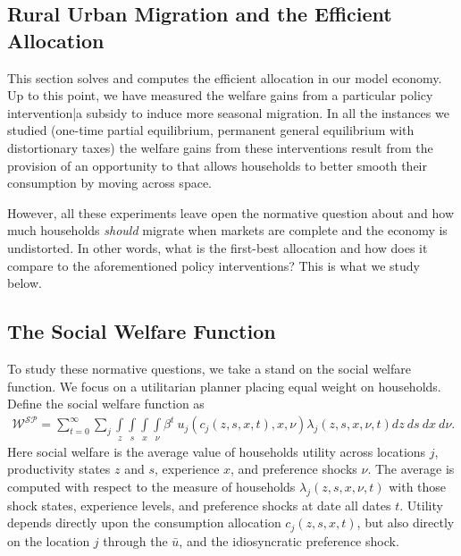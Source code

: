 \documentclass[12pt,pdftex]{article}
\begin{document}
\begin{onehalfspacing}
\newpage

\normalsize



\section{Rural Urban Migration and the Efficient Allocation}\label{sed:intro}

This section solves and computes the efficient allocation in our model economy. Up to this point, we have measured the welfare gains from a particular policy intervention|a subsidy to induce more seasonal migration. In all the instances we studied (one-time partial equilibrium, permanent general equilibrium with distortionary taxes) the welfare gains from these interventions result from the provision of an opportunity to that allows households to better smooth their consumption by moving across space.

However, all these experiments leave open the normative question about and how much households \emph{should} migrate when markets are complete and the economy is undistorted. In other words, what is the first-best allocation and how does it compare to the aforementioned policy interventions? This is what we study below.

\subsection{The Social Welfare Function}

To study these normative questions, we take a stand on the social welfare function. We focus on a utilitarian planner placing equal weight on households. Define the social welfare function as
\begin{align}
\mathcal{W^{SP}} = \sum_{t=0}^{\infty}\sum_{j} \int\limits_{z} \int\limits_{s} \int\limits_{x} \int\limits_{\nu} \beta^{t} \ u_{j}(c_{j}(z, s, x, t), x, \nu) \lambda_{j}(z, s, x, \nu, t) dz \ ds \ dx \ d\nu.
\label{eq:sp-social_welfare}
\end{align}
Here social welfare is the average value of households utility across locations $j$, productivity states $z$ and $s$, experience $x$, and preference shocks $\nu$. The average is computed with respect to the measure of households $\lambda_{j}(z, s, x, \nu, t)$ with those shock states, experience levels, and preference shocks at date all dates $t$. Utility depends directly upon the consumption allocation $c_{j}(z, s, x, t)$, but also  directly on the location $j$ through the $\bar u$, and the idiosyncratic preference shock.


\end{onehalfspacing}
\end{document}
